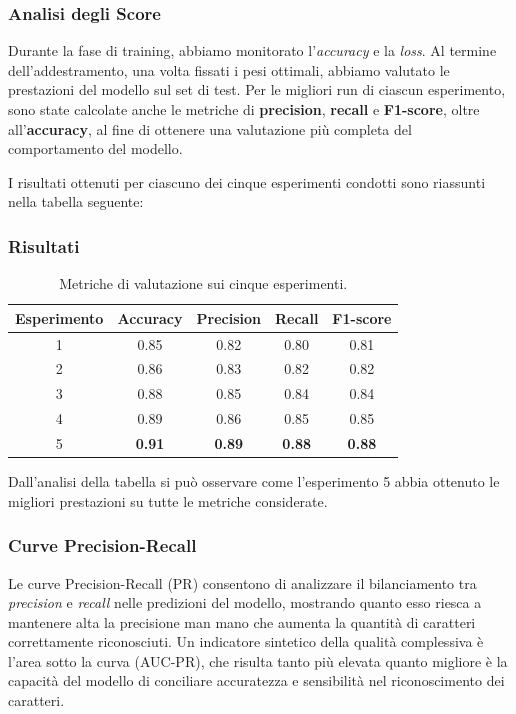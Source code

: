 \subsubsection*{Analisi degli Score}

Durante la fase di training, abbiamo monitorato l'\textit{accuracy} e la \textit{loss}. Al termine dell'addestramento, una volta fissati i pesi ottimali, abbiamo valutato le prestazioni del modello sul set di test. Per le migliori run di ciascun esperimento, sono state calcolate anche le metriche di \textbf{precision}, \textbf{recall} e \textbf{F1-score}, oltre all'\textbf{accuracy}, al fine di ottenere una valutazione più completa del comportamento del modello.

I risultati ottenuti per ciascuno dei cinque esperimenti condotti sono riassunti nella tabella seguente:

\subsubsection*{Risultati}
\begin{table}[H]
\centering
\begin{tabular}{c|c|c|c|c}
\textbf{Esperimento} & \textbf{Accuracy} & \textbf{Precision} & \textbf{Recall} & \textbf{F1-score} \\
\hline
1 & 0.85 & 0.82 & 0.80 & 0.81 \\
2 & 0.86 & 0.83 & 0.82 & 0.82 \\
3 & 0.88 & 0.85 & 0.84 & 0.84 \\
4 & 0.89 & 0.86 & 0.85 & 0.85 \\
5 & \textbf{0.91} & \textbf{0.89} & \textbf{0.88} & \textbf{0.88} \\
\end{tabular}
\caption{Metriche di valutazione sui cinque esperimenti.}
\label{tab:score_analysis}
\end{table}

Dall'analisi della tabella si può osservare come l'esperimento 5 abbia ottenuto le migliori prestazioni su tutte le metriche considerate.

\subsubsection*{Curve Precision-Recall}
Le curve Precision-Recall (PR) consentono di analizzare il bilanciamento tra \emph{precision} e \emph{recall} nelle predizioni del modello, mostrando quanto esso riesca a mantenere alta la precisione man mano che aumenta la quantità di caratteri correttamente riconosciuti. Un indicatore sintetico della qualità complessiva è l'area sotto la curva (AUC-PR), che risulta tanto più elevata quanto migliore è la capacità del modello di conciliare accuratezza e sensibilità nel riconoscimento dei caratteri.

